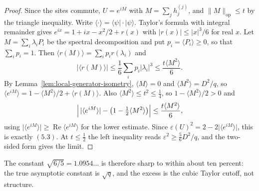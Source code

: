 \begin{proof}
Since the sites commute, \(U=e^{iM}\) with \(M=\sum_jh_j^{(j)}\), and
\(\lVert M\rVert_{\mathrm{op}}\leq t\) by the triangle inequality.  Write
\(\langle\cdot\rangle=\langle\psi\rvert\cdot\lvert\psi\rangle\).  Taylor's
formula with integral remainder gives
\(e^{ix}=1+ix-x^2/2+r(x)\) with \(\lvert r(x)\rvert\leq\lvert x\rvert^3/6\)
for real \(x\).  Let \(M=\sum_i\lambda_iP_i\) be the spectral decomposition
and put \(p_i=\langle P_i\rangle\geq0\), so that \(\sum_ip_i=1\).  Then
\(\langle r(M)\rangle=\sum_ip_ir(\lambda_i)\) and
\[
 \lvert\langle r(M)\rangle\rvert
  \leq\frac16\sum_ip_i\lvert\lambda_i\rvert^3
  \leq\frac{t\langle M^2\rangle}6 .
\]
By Lemma~\ref{lem:local-generator-isometry}, \(\langle M\rangle=0\) and
\(\langle M^2\rangle=D^2/q\), so
\(\langle e^{iM}\rangle=1-\langle M^2\rangle/2+\langle r(M)\rangle\).
Also \(\langle M^2\rangle\leq t^2\leq\frac14\), so
\(1-\langle M^2\rangle/2>0\) and
\[
 \Bigl\lvert\,\lvert\langle e^{iM}\rangle\rvert
   -\bigl(1-\tfrac12\langle M^2\rangle\bigr)\Bigr\rvert
 \leq\frac{t\langle M^2\rangle}6 ,
\]
using \(\lvert\langle e^{iM}\rangle\rvert\geq
\operatorname{Re}\langle e^{iM}\rangle\) for the lower estimate.  Since
\(\varepsilon(U)^2=2-2\lvert\langle e^{iM}\rangle\rvert\), this is exactly
\((5.3)\).  At \(t\leq\frac12\) the left inequality reads
\(\varepsilon^2\geq\frac56D^2/q\), and the two-sided form gives the
limit.
\end{proof}

The constant \(\sqrt{6/5}=1.0954\ldots\) is therefore sharp to within about
ten percent: the true asymptotic constant is \(\sqrt q\), and the excess is
the cubic Taylor cutoff, not structure.


